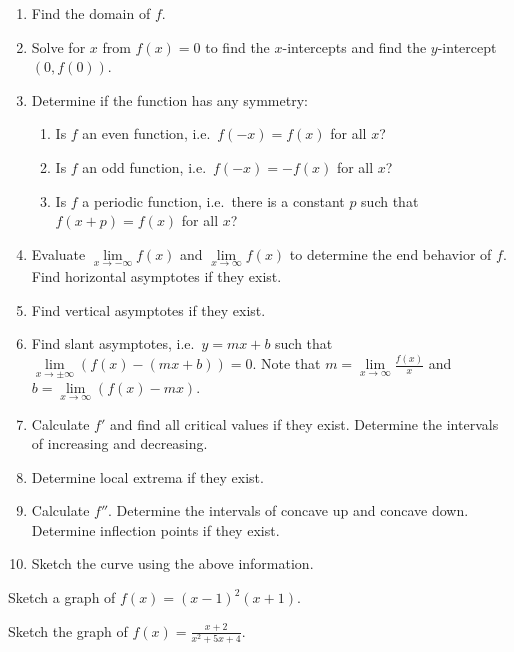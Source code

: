 \begin{enumerate}[sepno]
\item
  Find the domain of \(f\).
\item
  Solve for \(x\) from \(f(x)=0\) to find the \(x\)-intercepts and find
  the \(y\)-intercept \((0, f(0))\).
\item
  Determine if the function has any symmetry:

  \begin{enumerate}
  \def\labelenumii{(\alph{enumii})}
  \item
    Is \(f\) an even function, i.e.~\(f(-x)=f(x)\) for all \(x\)?
  \item
    Is \(f\) an odd function, i.e.~\(f(-x)=-f(x)\) for all \(x\)?
  \item
    Is \(f\) a periodic function, i.e.~there is a constant \(p\) such
    that \(f(x+p)=f(x)\) for all \(x\)?
  \end{enumerate}
\item
  Evaluate \(\lim\limits_{x\to -\infty} f(x)\) and
  \(\lim\limits_{x\to \infty} f(x)\) to determine the end behavior of
  \(f\). Find horizontal asymptotes if they exist.
\item
  Find vertical asymptotes if they exist.
\item
  Find slant asymptotes, i.e.~\(y=mx+b\) such that
  \(\lim\limits_{x\to \pm\infty}(f(x)-(mx+b))=0\). Note that
  \(m=\lim\limits_{x\to \infty}\frac{f(x)}{x}\) and
  \(b=\lim\limits_{x\to \infty}(f(x)-mx)\).
\item
  Calculate \(f'\) and find all critical values if they exist. Determine
  the intervals of increasing and decreasing.
\item
  Determine local extrema if they exist.
\item
  Calculate \(f''\). Determine the intervals of concave up and concave
  down. Determine inflection points if they exist.
\item
  Sketch the curve using the above information.
\end{enumerate}

\begin{example}
  
Sketch a graph of \(f(x)=(x - 1)^2(x+1).\)

\end{example}
\vspace*{10\baselineskip}


\begin{example}
  
Sketch the graph of \(f(x)=\frac{x+2}{x^2+5x+4}\).

\end{example}
\vspace*{10\baselineskip}

